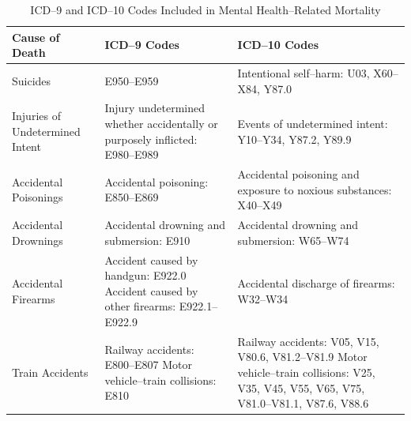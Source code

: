 \documentclass[12pt, a4paper]{article}
\begin{document}
\begin{table}[H]
\centering
\caption{ICD--9 and ICD--10 Codes Included in Mental Health--Related Mortality} %
\label{tab:mentalhealth_icd} %
\begin{tabular}{|>{\raggedright\arraybackslash}p{3cm}|>{\raggedright\arraybackslash}p{5cm}|>{\raggedright\arraybackslash}p{5cm}|}
\hline
\textbf{Cause of Death} & \textbf{ICD--9 Codes} & \textbf{ICD--10 Codes} \\ \hline
Suicides & E950--E959 & Intentional self--harm: U03, X60--X84, Y87.0 \\ \hline
Injuries of Undetermined Intent & Injury undetermined whether accidentally or purposely inflicted: E980--E989 & Events of undetermined intent: Y10--Y34, Y87.2, Y89.9 \\ \hline
Accidental Poisonings & Accidental poisoning: E850--E869 & Accidental poisoning and exposure to noxious substances: X40--X49 \\ \hline
Accidental Drownings & Accidental drowning and submersion: E910 & Accidental drowning and submersion: W65--W74 \\ \hline
Accidental Firearms & Accident caused by handgun: E922.0 \newline Accident caused by other firearms: E922.1--E922.9 & Accidental discharge of firearms: W32--W34 \\ \hline
Train Accidents & Railway accidents: E800--E807 \newline Motor vehicle--train collisions: E810 & Railway accidents: V05, V15, V80.6, V81.2--V81.9 \newline Motor vehicle--train collisions: V25, V35, V45, V55, V65, V75, V81.0--V81.1, V87.6, V88.6 \\ \hline
\end{tabular}
\end{table}
\end{document}
